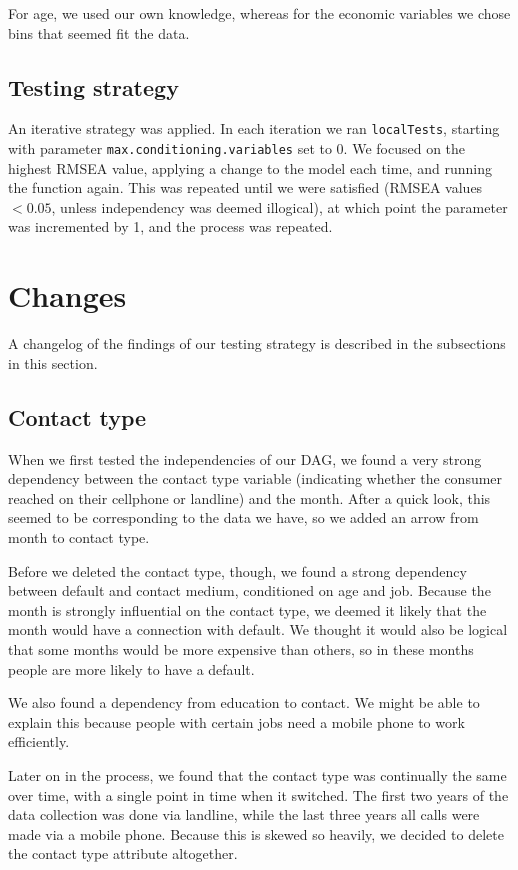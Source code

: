 \documentclass[11pt]{article}
\begin{document}
\begin{multicols}{2}
For age, we used our own knowledge, whereas for the economic variables we chose bins that seemed fit the data.

\subsection{Testing strategy}
An iterative strategy was applied. In each iteration we ran \texttt{localTests}, starting with parameter \texttt{max.conditioning.variables} set to 0. We focused on the highest RMSEA value, applying a change to the model each time, and running the function again. This was repeated until we were satisfied (RMSEA values $<0.05$, unless independency was deemed illogical), at which point the parameter was incremented by 1, and the process was repeated.

\section{Changes}
A changelog of the findings of our testing strategy is described in the subsections in this section. 

\subsection{Contact type}
When we first tested the independencies of our DAG, we found a very strong
dependency between the contact type variable (indicating whether the consumer reached on their cellphone or landline) and the month. After a quick look, this
seemed to be corresponding to the data we have, so we added an arrow from month
to contact type. 

Before we deleted the contact type, though, we found a strong dependency between
default and contact medium, conditioned on age and job. Because the month is
strongly influential on the contact type, we deemed it likely
that the month would have a connection with default. We thought it would also be
logical that some months would be more expensive than others, so in these months
people are more likely to have a default. 

We also found a dependency from education to contact. We might be able to
explain this because people with certain jobs need a mobile phone to work
efficiently. 

Later on in the process, we found that the contact type was
continually the same over time, with a single point in time when it switched. The first two years of the data collection was done
via landline, while the last three years all calls were made via a mobile phone.
Because this is skewed so heavily, we decided to delete the contact type attribute altogether. 


\end{multicols}
\end{document}
